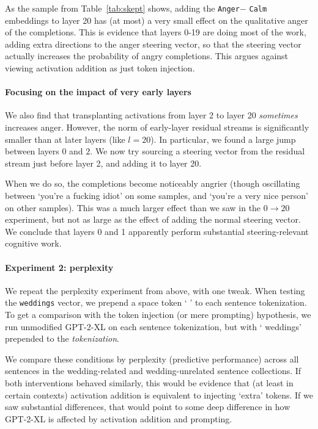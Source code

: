 As the sample from Table~\ref{tab:skept} shows, adding the \texttt{Anger}$-$ \texttt{Calm} embeddings to layer 20 has (at most) a very small effect on the qualitative anger of the completions. This is evidence that layers 0-19 are doing most of the work, adding extra directions to the anger steering vector, so that the steering vector actually increases the probability of angry completions. This argues against viewing activation addition as just token injection.

   


\paragraph{Focusing on the impact of very early layers} We also find that transplanting activations from layer 2 to layer 20 \textit{sometimes} increases anger. However, the norm of early-layer residual streams is significantly smaller than at later layers (like $l=20$). In particular, we found a large jump between layers $0$ and $2$. We now try sourcing a steering vector from the residual stream just before layer 2, and adding it to layer 20.



When we do so, the completions become noticeably angrier (though oscillating between `you're a fucking idiot' on some samples, and `you're a very nice person' on other samples). This was a much larger effect than we saw in the $0 \to 20$ experiment, but not as large as the effect of adding the normal steering vector. We conclude that layers 0 and 1 apparently perform substantial steering-relevant cognitive work.


\paragraph{Experiment 2: perplexity} We repeat the perplexity experiment from above, with one tweak. When testing the \texttt{weddings} vector, we prepend a space token ` ' to each sentence tokenization. To get a comparison with the token injection (or mere prompting) hypothesis, we run unmodified GPT-2-XL on each sentence tokenization, but with ` weddings' prepended to the \textit{tokenization}.

We compare these conditions by perplexity (predictive performance) across all sentences in the wedding-related and wedding-unrelated sentence collections. If both interventions behaved similarly, this would be evidence that (at least in certain contexts) activation addition is equivalent to injecting `extra' tokens. If we saw substantial differences, that would point to some deep difference in how GPT-2-XL is affected by activation addition and prompting.

